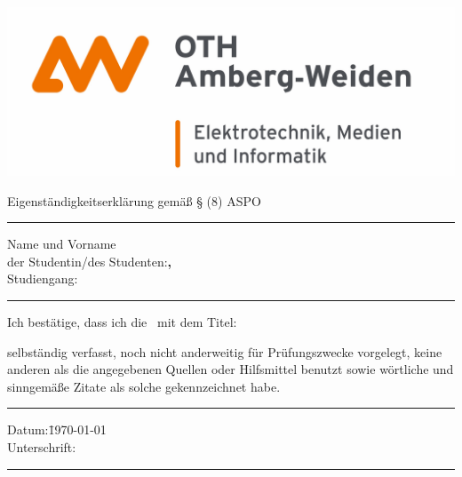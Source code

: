 %

\thispagestyle{empty}				%
\vspace*{-3cm}
\begin{minipage}{0.65\textwidth}
  \mbox{}
  \hfill

\end{minipage}
\begin{minipage}{0.37\textwidth}
\includegraphics[scale=.3]{logo.jpg}
\end{minipage}
\vspace{1.5cm}

Eigenständigkeitserklärung gemä\ss \: \S {} (8) ASPO\\
\rule[1ex]{\textwidth}{0.5pt}
\vspace*{0.5cm}
\begin{tabbing}
  Name und Vorname\\
  der Studentin/des Studenten:\qquad\=\textbf{\IhrNachname, \IhrVorname}\\[1cm]
  Studiengang:                      \>\textbf{\IhrStudiengang}
\end{tabbing}
\rule[1ex]{\textwidth}{0.5pt}
\vspace*{0.5cm}
Ich bestätige, dass ich die \IhreArbeit\ mit dem Titel:
\begin{center}
  \textbf{\IhrTitelDE}
\end{center}
\vspace*{0.5cm}
selbständig verfasst, noch nicht anderweitig für Prüfungszwecke vorgelegt, keine anderen als die angegebenen Quellen oder Hilfsmittel benutzt sowie wörtliche und sinngemäße Zitate als solche gekennzeichnet habe.\\[0.5cm]
\rule[1ex]{\textwidth}{0.5pt}
\begin{tabbing}
  Datum:\hspace{2cm}\=\today\\[1cm]
  Unterschrift:\>
\end{tabbing}
\rule[1ex]{\textwidth}{0.5pt}
\clearpage
